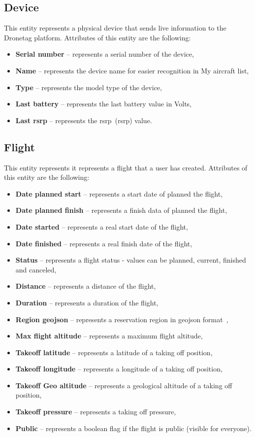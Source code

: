 \subsection{Device}\label{subsec:device}
This entity represents a physical device that sends live information to the Dronetag platform.
Attributes of this entity are the following:
\begin{itemize}
    \item \textbf{Serial number} -- represents a serial number of the device,
    \item \textbf{Name} -- represents the device name for easier recognition in My aircraft list,
    \item \textbf{Type} -- represents the model type of the device,
    \item \textbf{Last battery} -- represents the last battery value in Volts,
    \item \textbf{Last \acrshort{rsrp}} -- represents the \acrshort{rsrp}~(\acrlong{rsrp}) value.
\end{itemize}

\subsection{Flight}\label{subsec:flight}
This entity represents it represents a flight that a user has created.
Attributes of this entity are the following:
\begin{itemize}
    \item \textbf{Date planned start} -- represents a start date of planned the flight,
    \item \textbf{Date planned finish} -- represents a finish data of planned the flight,
    \item \textbf{Date started} -- represents a real start date of the flight,
    \item \textbf{Date finished} -- represents a real finish date of the flight,
    \item \textbf{Status} -- represents a flight status - values can be planned, current, finished and canceled,
    \item \textbf{Distance} -- represents a distance of the flight,
    \item \textbf{Duration} -- represents a duration of the flight,
    \item \textbf{Region \acrshort{geojson}} -- represents a reservation region in \acrshort{geojson} format~\cite{geoJson},
    \item \textbf{Max flight altitude} -- represents a maximum flight altitude,
    \item \textbf{Takeoff latitude} -- represents a latitude of a taking off position,
    \item \textbf{Takeoff longitude} -- represents a longitude of a taking off position,
    \item \textbf{Takeoff Geo altitude} -- represents a geological altitude of a taking off position,
    \item \textbf{Takeoff pressure} -- represents a taking off pressure,
    \item \textbf{Public} -- represents a boolean flag if the flight is public (visible for everyone).
\end{itemize}

